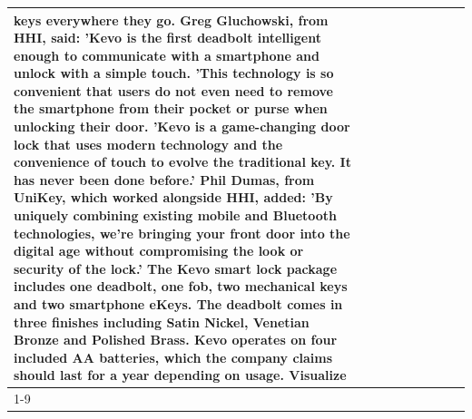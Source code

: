 \begin{table}[H]
\begin{tabular}{lllrlllll}
keys everywhere they go. Greg Gluchowski, from HHI, said: 'Kevo is the first deadbolt intelligent enough to communicate with a smartphone and unlock with a simple touch. 'This technology is so convenient that users do not even need to remove the smartphone from their pocket or purse when unlocking their door. 'Kevo is a game-changing door lock that uses modern technology and the convenience of touch to evolve the traditional key. It has never been done before.' Phil Dumas, from UniKey, which worked alongside HHI, added: 'By uniquely combining existing mobile and Bluetooth technologies, we’re bringing your front door into the digital age without compromising the look or security of the lock.' The Kevo smart lock package includes one deadbolt, one fob, two mechanical keys and two smartphone eKeys. The deadbolt comes in three finishes including Satin Nickel, Venetian Bronze and Polished Brass. Kevo operates on four included AA batteries, which the company claims should last for a year depending on usage. Visualize \\
\cline{1-9}

\end{tabular}
\end{table}
